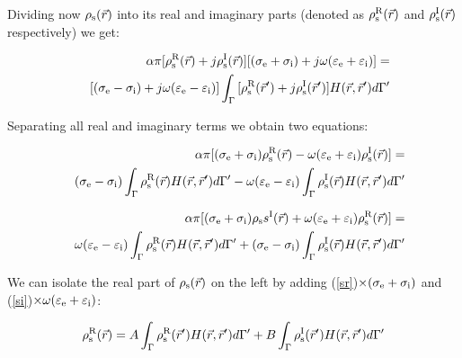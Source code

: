 \documentclass[12pt]{report}
\begin{document}
Dividing now $\rho_{\rm s}(\vec{r})$ into its real and imaginary parts (denoted as $\rho_{\rm s}^{\rm R}(\vec{r})$ and $\rho_{\rm s}^{\rm I}(\vec{r})$ respectively) we get:

\begin{eqnarray}
&&\alpha\pi[\rho_{\rm s}^{\rm R}(\vec{r})+j\rho_{\rm s}^{\rm I}(\vec{r})][(\sigma_{\rm e}+\sigma_{\rm i})+j\omega(\varepsilon_{\rm e}+\varepsilon_{\rm i})]=\nonumber\\
&&[(\sigma_{\rm e}-\sigma_{\rm i})+j\omega(\varepsilon_{\rm e}-\varepsilon_{\rm i})]\int_\Gamma{[\rho_{\rm s}^{\rm R}(\vec{r}^\prime)+j\rho_{\rm s}^{\rm I}(\vec{r}^\prime)]H(\vec{r},\vec{r}^\prime)d\Gamma^\prime}
\end{eqnarray}

Separating all real and imaginary terms we obtain two equations:

\begin{eqnarray}
&&\alpha\pi[(\sigma_{\rm e}+\sigma_{\rm i})\rho_{\rm s}^{\rm R}(\vec{r})-\omega(\varepsilon_{\rm e}+\varepsilon_{\rm i})\rho_{\rm s}^{\rm I}(\vec{r})]=\nonumber\\
&&(\sigma_{\rm e}-\sigma_{\rm i})\int_\Gamma{\rho_{\rm s}^{\rm R}(\vec{r})H(\vec{r},\vec{r}^\prime)d\Gamma^\prime}-\omega(\varepsilon_{\rm e}-\varepsilon_{\rm i})\int_\Gamma{\rho_{\rm s}^{\rm I}(\vec{r})H(\vec{r},\vec{r}^\prime)d\Gamma^\prime}\label{sr}
\end{eqnarray}

\begin{eqnarray}
&&\alpha\pi[(\sigma_{\rm e}+\sigma_{\rm i})\rho_{\rm s}s^{\rm I}(\vec{r})+\omega(\varepsilon_{\rm e}+\varepsilon_{\rm i})\rho_{\rm s}^{\rm R}(\vec{r})]=\nonumber\\
&&\omega(\varepsilon_{\rm e}-\varepsilon_{\rm i})\int_\Gamma{\rho_{\rm s}^{\rm R}(\vec{r})H(\vec{r},\vec{r}^\prime)d\Gamma^\prime}+(\sigma_{\rm e}-\sigma_{\rm i})\int_\Gamma{\rho_{\rm s}^{\rm I}(\vec{r})H(\vec{r},\vec{r}^\prime)d\Gamma^\prime}\label{si}
\end{eqnarray}

We can isolate the real part of $\rho_{\rm s}(\vec{r})$ on the left by adding (\ref{sr})$\times(\sigma_{\rm e}+\sigma_{\rm i})$ and (\ref{si})$\times\omega(\varepsilon_{\rm e}+\varepsilon_{\rm i})$:

\begin{equation}
\rho_{\rm s}^{\rm R}(\vec{r})=A\int_\Gamma{\rho_{\rm s}^{\rm R}(\vec{r}^\prime)H(\vec{r},\vec{r}^\prime)d\Gamma^\prime}+B\int_\Gamma{\rho_{\rm s}^{\rm I}(\vec{r}^\prime)H(\vec{r},\vec{r}^\prime)d\Gamma^\prime}\label{sr_final}
\end{equation}
\end{document}
